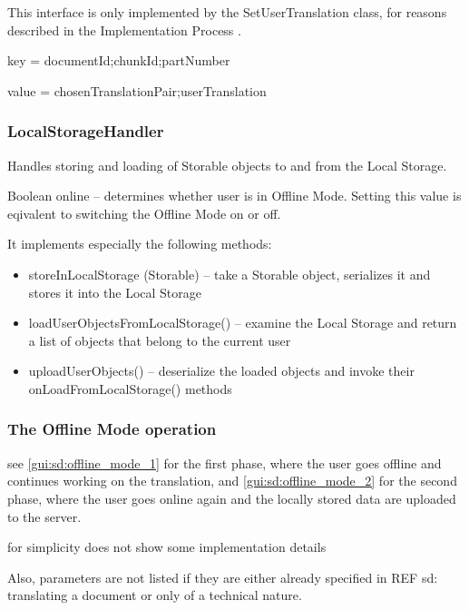 This interface is only implemented by the SetUserTranslation class, for reasons described in the Implementation Process .


key = documentId;chunkId;partNumber

value = chosenTranslationPair;userTranslation

\subsubsection{LocalStorageHandler}

Handles storing and loading of Storable objects to and from the Local Storage.

Boolean online -- determines whether user is in Offline Mode. Setting this value is eqivalent to switching the Offline Mode on or off.

It implements especially the following methods:

\begin{itemize}
\item storeInLocalStorage (Storable) -- take a Storable object, serializes it and stores it into the Local Storage

\item loadUserObjectsFromLocalStorage() -- examine the Local Storage and return a list of objects that belong to the current user

\item uploadUserObjects() -- deserialize the loaded objects and invoke their onLoadFromLocalStorage() methods
\end{itemize}

\subsubsection{The Offline Mode operation}


see \ref{gui:sd:offline_mode_1} for the first phase, where the user goes offline and continues working on the translation, and \ref{gui:sd:offline_mode_2} for the second phase, where the user goes online again and the locally stored data are uploaded to the server.

for simplicity does not show some implementation details

Also, parameters are not listed if they are either already specified in REF sd: translating a document or only of a technical nature.


